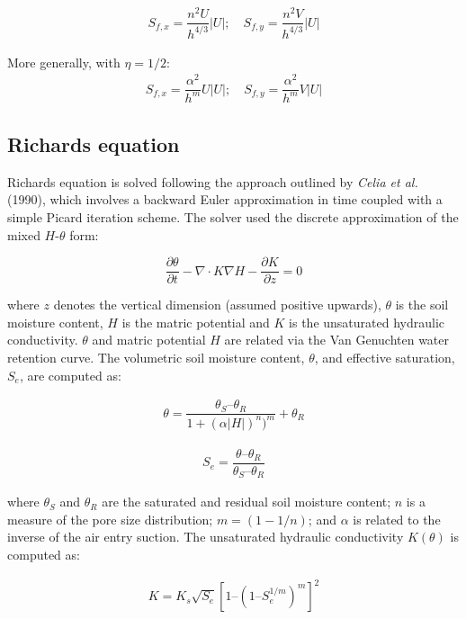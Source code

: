 \documentclass{article}
\begin{document}
\begin{eqnarray} \nonumber
S_{f,x} =  \dfrac{n^2 U}{h^{4/3}} |U|; \quad
S_{f,y} = \dfrac{n^2 V}{h^{4/3}} |U|
\end{eqnarray}

\noindent More generally, with $\eta=1/2$:
\begin{eqnarray} \nonumber
S_{f,x} = \dfrac{\alpha^2 }{h^m}  U |U|; \quad
S_{f,y} = \dfrac{\alpha^2 }{h^m} V |U|
\end{eqnarray}


\subsection{Richards equation}

Richards equation is solved following the approach outlined by \textit{Celia et al.} (1990), which involves a backward Euler approximation in time coupled with a simple Picard iteration scheme.  
The solver used the discrete approximation of the  mixed $H$-$\theta$ form: 

\begin{equation} 
	\dfrac{\partial \theta}{\partial t} - \nabla \cdot K \nabla H - \dfrac{\partial K}{\partial z} = 0
\label{richards}
\end{equation}

\noindent where $z$ denotes the vertical dimension (assumed positive upwards),  $\theta$ is the soil moisture content, $H$ is the matric potential and $K$ is the unsaturated hydraulic conductivity.
 $\theta$ and matric potential $H$ are related via the Van Genuchten water retention curve. The volumetric soil moisture content, $\theta$, and effective saturation, $S_e$, are computed as:

\begin{eqnarray} \nonumber
\theta = \dfrac{\theta_S – \theta_R}{1 + (\alpha|H|)^n)^m} + \theta_R
\label{vanG_eqn}
\end{eqnarray}

\begin{eqnarray} \nonumber
S_e = \dfrac{\theta – \theta_R}{\theta_S – \theta_R}
\label{Se}
\end{eqnarray}

 where $\theta_S$ and  $\theta_R$ are the saturated and residual soil moisture content; $n$ is a measure of the pore size distribution; $m=(1-1/n)$; and $\alpha$  is related to the inverse of the air entry suction.  The unsaturated hydraulic conductivity $K(\theta)$ is computed as:

\begin{eqnarray}
K = K_s \sqrt{S_e} [1 – (1 – S_e^{1/m})^m]^2
\label{K}
\end{eqnarray}
\end{document}
